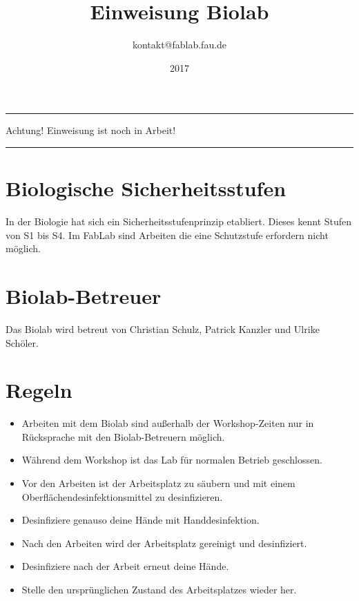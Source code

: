 \documentclass[13pt]{\basedir/fablab-document}
\date{2017}
\author{kontakt@fablab.fau.de}
\title{Einweisung Biolab}
\begin{document}
\color{red}
\hrule
\begin{center}
	\large{Achtung! Einweisung ist noch in Arbeit!}
	\vspace{0.1cm}
\end{center}
\hrule
\color{black}

\maketitle

\vbox{\vspace{1cm}}


\section{Biologische Sicherheitsstufen}
In der Biologie hat sich ein Sicherheitsstufenprinzip etabliert.
Dieses kennt Stufen von S1 bis S4.
Im FabLab sind Arbeiten die eine Schutzstufe erfordern nicht möglich.

\section{Biolab-Betreuer}
Das Biolab wird betreut von Christian Schulz, Patrick Kanzler und Ulrike Schöler.

\section{Regeln}
\begin{itemize}
\item Arbeiten mit dem Biolab sind außerhalb der Workshop-Zeiten nur in Rücksprache mit den Biolab-Betreuern möglich.
\item Während dem Workshop ist das Lab für normalen Betrieb geschlossen.
\item Vor den Arbeiten ist der Arbeitsplatz zu säubern und mit einem Oberflächendesinfektionsmittel zu desinfizieren.
\item Desinfiziere genauso deine Hände mit Handdesinfektion.
\item Nach den Arbeiten wird der Arbeitsplatz gereinigt und desinfiziert.
\item Desinfiziere nach der Arbeit erneut deine Hände.
\item Stelle den ursprünglichen Zustand des Arbeitsplatzes wieder her.
\end{itemize}

\end{document}
